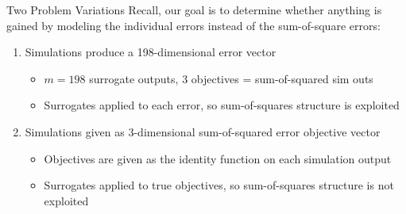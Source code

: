 \documentclass[aspectratio=169]{beamer}
\newcommand{\cmark}{\ding{51}}
\newcommand{\xmark}{\ding{55}}
\begin{document}
\begin{frame}{Two Problem Variations}
Recall, our goal is to determine whether anything is gained by modeling
the individual errors instead of the sum-of-square errors:
\pause
\begin{enumerate}
\item Simulations produce a 198-dimensional error vector
\begin{itemize}
\item $m=198$ surrogate outputs, $3$ objectives = sum-of-squared sim outs
\item Surrogates applied to each error, so sum-of-squares structure
is exploited {\huge \color{green} \cmark}
\end{itemize}
\pause
\item Simulations given as 3-dimensional sum-of-squared error objective vector
\begin{itemize}
\item Objectives are given as the identity function on each simulation
output
\item Surrogates applied to true objectives, so sum-of-squares structure
is not exploited {\huge \color{red} \xmark}
\end{itemize}
\end{enumerate}
\end{frame}
\end{document}
